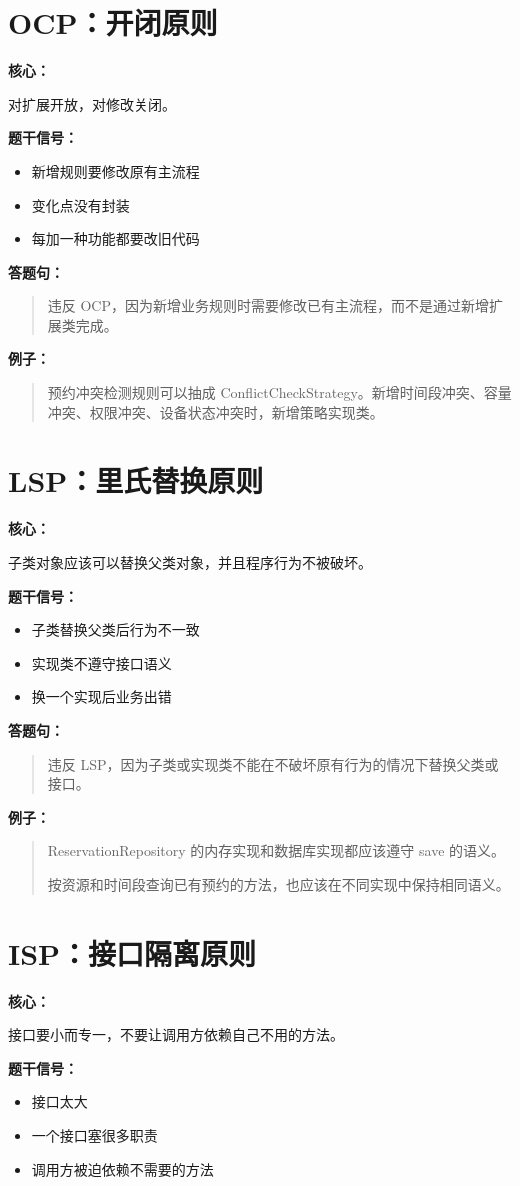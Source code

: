 \documentclass[UTF8,zihao=-4]{ctexart}
\newcommand{\principle}[1]{%
  \section*{\color{TitleBlue}#1}
}
\newcommand{\labeltext}[1]{%
  \textbf{#1}
}
\newenvironment{answerbox}{%
  \begin{quote}\small\color{TextGray}
}{%
  \end{quote}
}
\begin{document}
\principle{OCP：开闭原则}

\labeltext{核心：}
对扩展开放，对修改关闭。

\labeltext{题干信号：}
\begin{itemize}
  \item 新增规则要修改原有主流程
  \item 变化点没有封装
  \item 每加一种功能都要改旧代码
\end{itemize}

\labeltext{答题句：}
\begin{answerbox}
违反 OCP，因为新增业务规则时需要修改已有主流程，而不是通过新增扩展类完成。
\end{answerbox}

\labeltext{例子：}
\begin{answerbox}
预约冲突检测规则可以抽成 ConflictCheckStrategy。新增时间段冲突、容量冲突、权限冲突、设备状态冲突时，新增策略实现类。
\end{answerbox}

\principle{LSP：里氏替换原则}

\labeltext{核心：}
子类对象应该可以替换父类对象，并且程序行为不被破坏。

\labeltext{题干信号：}
\begin{itemize}
  \item 子类替换父类后行为不一致
  \item 实现类不遵守接口语义
  \item 换一个实现后业务出错
\end{itemize}

\labeltext{答题句：}
\begin{answerbox}
违反 LSP，因为子类或实现类不能在不破坏原有行为的情况下替换父类或接口。
\end{answerbox}

\labeltext{例子：}
\begin{answerbox}
ReservationRepository 的内存实现和数据库实现都应该遵守 save 的语义。

按资源和时间段查询已有预约的方法，也应该在不同实现中保持相同语义。
\end{answerbox}

\principle{ISP：接口隔离原则}

\labeltext{核心：}
接口要小而专一，不要让调用方依赖自己不用的方法。

\labeltext{题干信号：}
\begin{itemize}
  \item 接口太大
  \item 一个接口塞很多职责
  \item 调用方被迫依赖不需要的方法
\end{itemize}
\end{document}
